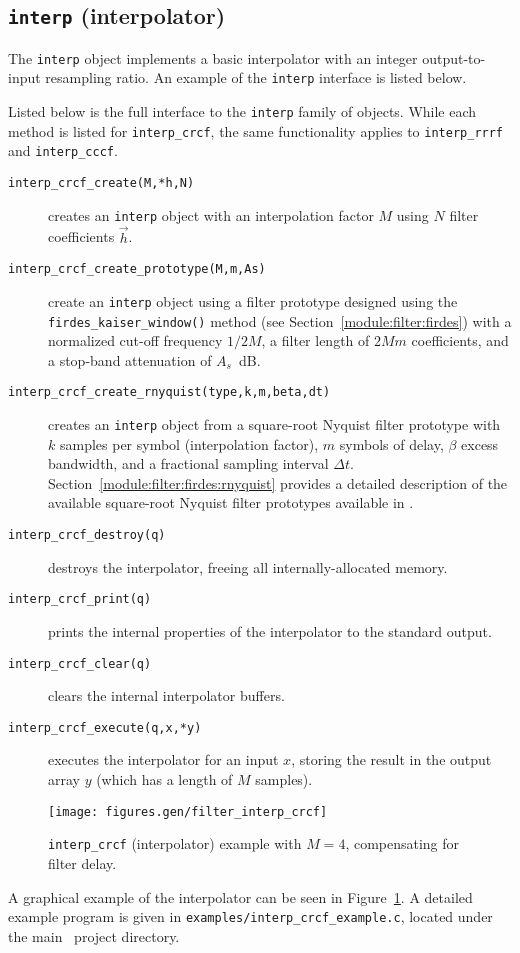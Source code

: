\subsection{{\tt interp} (interpolator)}
\label{module:filter:interp}
The {\tt interp} object implements a basic interpolator with an integer
output-to-input resampling ratio.
An example of the {\tt interp} interface is listed below.
%

%
Listed below is the full interface to the {\tt interp} family of
objects.
While each method is listed for {\tt interp\_crcf}, the same
functionality applies to {\tt interp\_rrrf} and {\tt interp\_cccf}.
%
\begin{description}
\item[{\tt interp\_crcf\_create(M,*h,N)}]
    creates an {\tt interp} object with an interpolation factor $M$
    using $N$ filter coefficients $\vec{h}$.
\item[{\tt interp\_crcf\_create\_prototype(M,m,As)}]
    create an {\tt interp} object using a filter prototype designed
    using the {\tt firdes\_kaiser\_window()} method
    (see Section~\ref{module:filter:firdes})
    with a normalized cut-off frequency $1/2M$,
    a filter length of $2Mm$ coefficients,
    and a stop-band attenuation of $A_s$~dB.
\item[{\tt interp\_crcf\_create\_rnyquist(type,k,m,beta,dt)}]
    creates an {\tt interp} object
    from a square-root Nyquist filter prototype with
    $k$ samples per symbol (interpolation factor),
    $m$ symbols of delay,
    $\beta$ excess bandwidth,
    and a fractional sampling interval $\Delta t$.
    Section~\ref{module:filter:firdes:rnyquist}
    provides a detailed description of the available square-root Nyquist
    filter prototypes available in \liquid.
\item[{\tt interp\_crcf\_destroy(q)}]
    destroys the interpolator, freeing all internally-allocated memory.
\item[{\tt interp\_crcf\_print(q)}]
    prints the internal properties of the interpolator to the standard
    output.
\item[{\tt interp\_crcf\_clear(q)}]
    clears the internal interpolator buffers.
\item[{\tt interp\_crcf\_execute(q,x,*y)}]
    executes the interpolator for an input $x$, storing the result in
    the output array $y$ (which has a length of $M$ samples).
\end{description}
%
\begin{figure}
\centering
  \texttt{[image: figures.gen/filter\_interp\_crcf]}
\caption{{\tt interp\_crcf} (interpolator) example with $M=4$,
         compensating for filter delay.}
\label{fig:module:filter:interp_crcf}
\end{figure}
%
A graphical example of the interpolator can be seen in
Figure~\ref{fig:module:filter:interp_crcf}.
A detailed example program is given in
{\tt examples/interp\_crcf\_example.c},
located under the main \liquid\ project directory.


